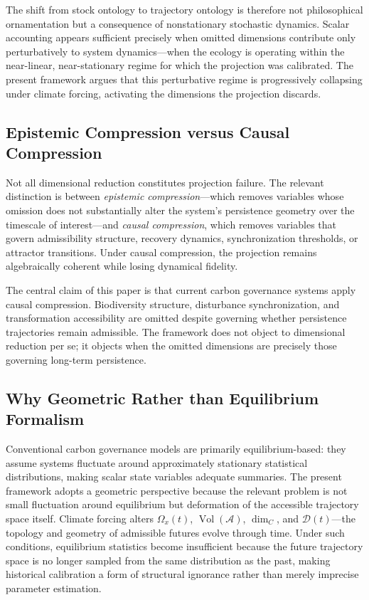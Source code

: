 \documentclass[12pt]{article}
\newcommand{\Acal}{\mathcal{A}}
\newcommand{\vol}{\operatorname{Vol}}
\begin{document}
The shift from stock ontology to trajectory ontology is therefore not philosophical
ornamentation but a consequence of nonstationary stochastic dynamics. Scalar accounting
appears sufficient precisely when omitted dimensions contribute only perturbatively to
system dynamics---when the ecology is operating within the near-linear, near-stationary
regime for which the projection was calibrated. The present framework argues that this
perturbative regime is progressively collapsing under climate forcing, activating the
dimensions the projection discards.

\subsection{Epistemic Compression versus Causal Compression}

Not all dimensional reduction constitutes projection failure. The relevant distinction
is between \emph{epistemic compression}---which removes variables whose omission does
not substantially alter the system's persistence geometry over the timescale of
interest---and \emph{causal compression}, which removes variables that govern
admissibility structure, recovery dynamics, synchronization thresholds, or attractor
transitions. Under causal compression, the projection remains algebraically coherent
while losing dynamical fidelity.

The central claim of this paper is that current carbon governance systems apply causal
compression. Biodiversity structure, disturbance synchronization, and transformation
accessibility are omitted despite governing whether persistence trajectories remain
admissible. The framework does not object to dimensional reduction per se; it objects
when the omitted dimensions are precisely those governing long-term persistence.

\subsection{Why Geometric Rather than Equilibrium Formalism}

Conventional carbon governance models are primarily equilibrium-based: they assume
systems fluctuate around approximately stationary statistical distributions, making
scalar state variables adequate summaries. The present framework adopts a geometric
perspective because the relevant problem is not small fluctuation around equilibrium
but deformation of the accessible trajectory space itself. Climate forcing alters
$\Omega_x(t)$, $\vol(\Acal)$, $\dim_C$, and $\mathcal{D}(t)$---the topology and
geometry of admissible futures evolve through time. Under such conditions, equilibrium
statistics become insufficient because the future trajectory space is no longer sampled
from the same distribution as the past, making historical calibration a form of
structural ignorance rather than merely imprecise parameter estimation.
\end{document}
